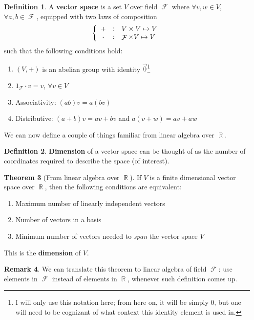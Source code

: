 \documentclass[11pt]{amsart} %
\theoremstyle{definition}
\newtheorem{definition}{Definition}[section]
\newtheorem{theorem}[definition]{Theorem}
\theoremstyle{definition}
\newtheorem{remark}[definition]{Remark}
\DeclareMathOperator{\R}{\mathbb{R}}
\DeclareMathOperator{\FF}{\mathcal{F}}
\numberwithin{equation}{section}
\begin{document}
\begin{definition}
	A \textbf{vector space} is a set $V$ over field $\FF$ where $\forall v,w \in V$, $\forall a,b \in \FF$, equipped with two laws of composition
	$$\left\{ \begin{array}{c c l}
	+ & : & V \times V \mapsto V\\
	\cdot  & : &  \FF \times V \mapsto V \\
	\end{array} \right.$$
	such that the following conditions hold:
	\begin{enumerate}%
		\item $(V,+)$ is an abelian group with identity $\vec{0}$\footnote{I will only use this notation here; from here on, it will be simply $0$, but one will need to be cognizant of what context this identity element is used in.}
		\item $1_{\FF} \cdot v = v$, $\forall v \in V$
		\item Associativity: $(ab)v = a(bv)$
		\item Distributive: $(a+b) v = av + bv$ and $a(v+w) = av + aw$
	\end{enumerate}
\end{definition}

We can now define a couple of things familiar from linear algebra over $\R$.

\begin{definition}
	\textbf{Dimension} of a vector space can be thought of as the number of coordinates required to describe the space (of interest).
\end{definition}

\begin{theorem}[From linear algebra over $\R$]
	If $V$ is a finite dimensional vector space over $\R$, then the following conditions are equivalent:
	\begin{enumerate}%
		\item Maximum number of linearly independent vectors
		\item Number of vectors in a basis
		\item Minimum number of vectors needed to \textit{span} the vector space $V$
	\end{enumerate}
	This is the \textbf{dimension} of $V$.
\end{theorem}

\begin{remark}
	We can translate this theorem to linear algebra of field $\FF$: use elements in $\FF$ instead of elements in $\R$, whenever such definition comes up.
\end{remark}
\end{document}
